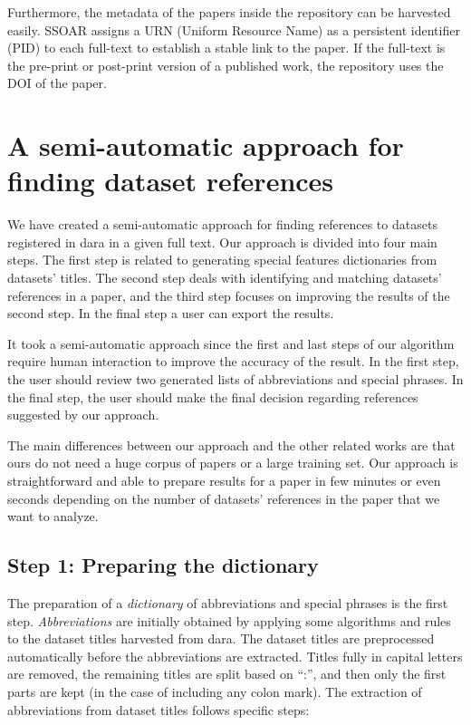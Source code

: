 \documentclass{IOS-Book-Article}
\newcommand{\dara}{\textsf{da\textbar ra}}
\begin{document}
Furthermore, the metadata of the papers inside the repository can be harvested easily.
SSOAR assigns a URN (Uniform Resource Name) as a persistent identifier (PID) to each full-text to establish a stable link to the paper.
If the full-text is the pre-print or post-print version of a published work, the repository uses the DOI of the paper.

\section{A semi-automatic approach for finding dataset references}
\label{sec:approach}
We have created a semi-automatic approach for finding references to datasets registered in {\dara} in a given full text. 
Our approach is divided into four main steps. The first step is related to generating special features dictionaries from datasets' titles. The second step deals with identifying and matching datasets' references in a paper, and the third step focuses on improving the results of the second step. In the final step a user can export the results.

It took a semi-automatic approach since 
the first and last steps of our algorithm require human interaction to improve the accuracy of the result. 
In the first step, the user should review two generated lists of abbreviations and special phrases. In the final step, the user should make the final decision regarding references suggested by our approach.

The main differences between our approach and the other related works are that ours do not need a huge corpus of papers or a large training set. Our approach is straightforward and able to prepare results for a paper in few minutes or even seconds depending on the number of datasets' references in the paper that we want to analyze.

\subsection{Step 1: Preparing the dictionary}
\label{sec:preparing-dictionary}
The preparation of a \emph{dictionary} of abbreviations and special phrases is the first step. \emph{Abbreviations} are initially obtained by applying some algorithms and rules to the dataset titles harvested from {\dara}.
The dataset titles are preprocessed automatically before the abbreviations are extracted. Titles fully in capital letters are removed, the remaining titles are split based on \enquote{:}, and then only the first parts are kept (in the case of including any colon mark).
The extraction of abbreviations from dataset titles follows specific steps:
\end{document}
